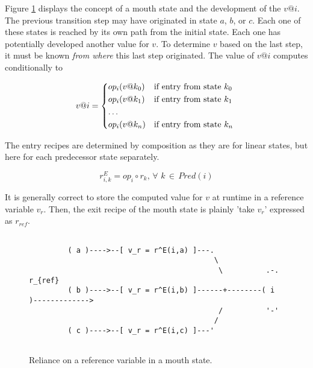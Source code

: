 \documentclass[12pt,a4paper]{scrartcl}
\begin{document}
Figure \ref{fig:mouth-state} displays the concept of a mouth state and the
development of the $v@i$. The previous transition step may have originated in
state $a$, $b$, or $c$. Each one of these states is reached by its own path from
the initial state. Each one has potentially developed another value for $v$. 
To determine $v$ based on the last step, it must be known \textit{from where}
this last step originated. The value of $v@i$ computes conditionally to

\begin{equation} \label{eq:interference}
    v@i = \begin{dcases*}
            op_i(v@k_0) & if entry from state $k_0$ \\
            op_i(v@k_1) & if entry from state $k_1$ \\
            \ldots \\
            op_i(v@k_n) & if entry from state $k_n$ \\
        \end{dcases*}
\end{equation}

The entry recipes are determined by composition as they are for linear
states, but here for each predecessor state separately.

\begin{equation} \label{eq:mouth-composition}
    r^E_{i,k} = op_i \circ r_k,\,\forall\,\,k\,\in\,Pred(i)
\end{equation}

It is generally correct to store the computed value for $v$ at runtime in a
reference variable $v_r$. Then,  the exit recipe of the mouth state is plainly
'take $v_r$' expressed as $r_{ref}$.

\begin{figure}[htbp] \leavevmode \label{fig:mouth-state}
    \begin{verbatim}

         ( a )---->--[ v_r = r^E(i,a) ]---.
                                           \ 
                                            \          .-.    r_{ref}
         ( b )---->--[ v_r = r^E(i,b) ]------+--------( i )-------------> 
                                            /          '-'
                                           /
         ( c )---->--[ v_r = r^E(i,c) ]---'
             

    \end{verbatim}
    \caption{Reliance on a reference variable in a mouth state.}
\end{figure}
\end{document}
